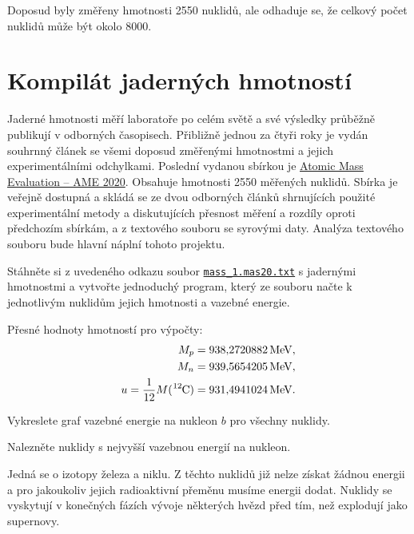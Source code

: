 \documentclass[a4paper,12pt,oneside]{article}
\def\unit#1{\,\mathrm{#1}}
\def\c{,\!}                             %
\def\file#1#2{\textnormal{{\texttt{\href{#1}{#2}}}}}
\theoremstyle{red}
\begin{document}
    Doposud byly změřeny hmotnosti 2550 nuklidů, ale odhaduje se, že celkový počet nuklidů může být okolo 8000.

\section{Kompilát jaderných hmotností}
    Jaderné hmotnosti měří laboratoře po celém světě a své výsledky průběžně publikují v odborných časopisech.
    Přibližně jednou za čtyři roky je vydán souhrnný článek se všemi doposud změřenými hmotnostmi a jejich experimentálními odchylkami.
    Poslední vydanou sbírkou je \href{https://www-nds.iaea.org/amdc/}{Atomic Mass Evaluation -- AME 2020}.
    Obsahuje hmotnosti 2550 měřených nuklidů.
    Sbírka je veřejně dostupná a skládá se ze dvou odborných článků shrnujících použité experimentální metody a diskutujících přesnost měření a rozdíly oproti předchozím sbírkám, a z textového souboru se syrovými daty.
    Analýza textového souboru bude hlavní náplní tohoto projektu.

    \begin{task}
        Stáhněte si z uvedeného odkazu soubor \file{https://www-nds.iaea.org/amdc/ame2020/mass_1.mas20.txt}{mass\_1.mas20.txt} s jadernými hmotnostmi a vytvořte jednoduchý program, který ze souboru načte k jednotlivým nuklidům jejich hmotnosti a vazebné energie.
    \end{task}

    Přesné hodnoty hmotností pro výpočty:
    \begin{align}
        M_{p}&=938\c2720882\unit{MeV},\\
        M_{n}&=939\c5654205\unit{MeV},\\
        u=\frac{1}{12}M(\ce{^{12}C})&=931\c4941024\unit{MeV}.
    \end{align}

    \begin{task}
        Vykreslete graf vazebné energie na nukleon $b$ pro všechny nuklidy.
    \end{task}

    \begin{task}
        Nalezněte nuklidy s nejvyšší vazebnou energií na nukleon.
    \end{task}
    Jedná se o izotopy železa a niklu.
    Z těchto nuklidů již nelze získat žádnou energii a pro jakoukoliv jejich radioaktivní přeměnu musíme energii dodat.
    Nuklidy se vyskytují v konečných fázích vývoje některých hvězd před tím, než explodují jako supernovy.
\end{document}
